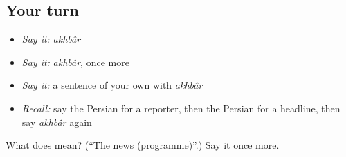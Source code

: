 \subsection*{Your turn}
\begin{itemize}
\raggedright
  \item \emph{Say it:} \emph{akhbâr}
  \item \emph{Say it:} \emph{akhbâr}, once more
  \item \emph{Say it:} a sentence of your own with \emph{akhbâr}
  \item \emph{Recall:} say the Persian for a reporter, then the Persian for a headline, then say \emph{akhbâr} again
\end{itemize}

\begin{tcolorbox}[breakable,colback=teal!4,colframe=teal!35!black,title={Before you move on}]
What does  mean? (\textquotedblleft{}The news (programme)\textquotedblright{}.) Say it once more.
\end{tcolorbox}
